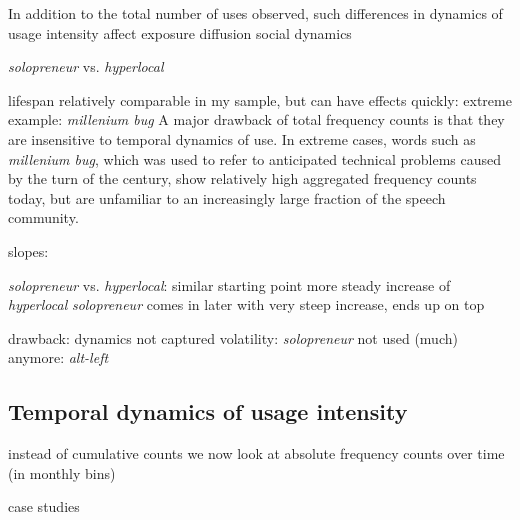 \documentclass[
  a4paper,
  abstract=on,
  captions=tableabove
  ]{scrartcl}
\begin{document}
  In addition to the total number of uses observed, such differences in dynamics of usage intensity
      affect
        exposure
        diffusion
        social dynamics



    \emph{solopreneur} vs. \emph{hyperlocal}

    lifespan
      relatively comparable in my sample, but can have effects quickly:
      extreme example: \emph{millenium bug}
        A major drawback of total frequency counts is that they are insensitive to temporal dynamics of use. In extreme cases, words such as \emph{millenium bug}, which was used to refer to anticipated technical problems caused by the turn of the century, show relatively high aggregated frequency counts today, but are unfamiliar to an increasingly large fraction of the speech community.


  slopes:

    \emph{solopreneur} vs. \emph{hyperlocal}:
      similar starting point
      more steady increase of \emph{hyperlocal}
      \emph{solopreneur} comes in later with very steep increase, ends up on top

  drawback: dynamics not captured
    volatility: \emph{solopreneur}
    not used (much) anymore: \emph{alt-left}


    \subsection{Temporal dynamics of usage intensity}

  instead of cumulative counts we now look at absolute frequency counts over time (in monthly bins)

  case studies
\end{document}
